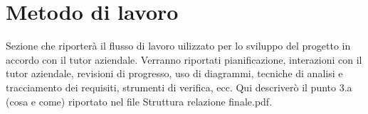 \section{Metodo di lavoro}

Sezione che riporterà il flusso di lavoro uilizzato per lo sviluppo del progetto in accordo con il tutor aziendale.
Verranno riportati pianificazione, interazioni con il tutor aziendale, revisioni di progresso, uso di diagrammi,
tecniche di analisi e tracciamento dei requisiti, strumenti di verifica, ecc.
Qui descriverò il punto 3.a (cosa e come) riportato nel file Struttura relazione finale.pdf.
